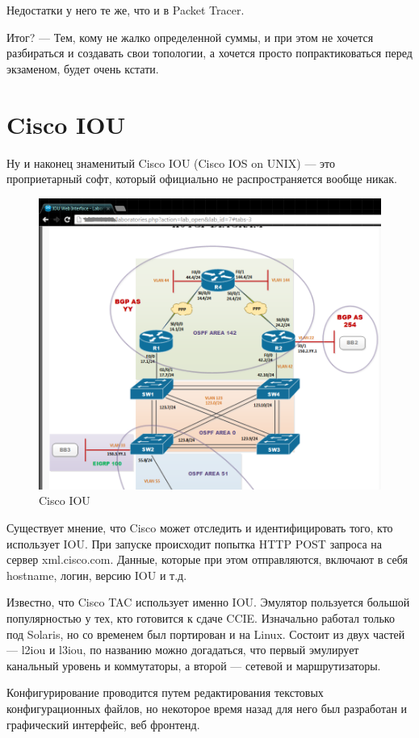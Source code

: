\documentclass[a4paper,14pt]{extreport}
\begin{document}
	
	Недостатки у него те же, что и в Packet Tracer.
	
	Итог?
	— Тем, кому не жалко определенной суммы, и при этом не хочется разбираться и создавать свои топологии, а хочется просто попрактиковаться перед экзаменом, будет очень кстати.
	
	\section{Cisco IOU}
	
	Ну и наконец знаменитый Cisco IOU (Cisco IOS on UNIX) — это проприетарный софт, который официально не распространяется вообще никак.
	
\begin{figure}[h!]
\centering
\includegraphics[width=0.7\linewidth]{pic/ciscoIOU}
\caption{Cisco IOU}
\label{fig:ciscoIOU}
\end{figure}
	
	Существует мнение, что Cisco может отследить и идентифицировать того, кто использует IOU.
	При запуске происходит попытка HTTP POST запроса на сервер xml.cisco.com.
	Данные, которые при этом отправляются, включают в себя hostname, логин, версию IOU и т.д.
	
	Известно, что Cisco TAC использует именно IOU.
	Эмулятор пользуется большой популярностью у тех, кто готовится к сдаче CCIE.
	Изначально работал только под Solaris, но со временем был портирован и на Linux.
	Состоит из двух частей — l2iou и l3iou, по названию можно догадаться, что первый эмулирует канальный уровень и коммутаторы, а второй — сетевой и маршрутизаторы.
	
	Конфигурирование проводится путем редактирования текстовых конфигурационных файлов, но некоторое время назад для него был разработан и графический интерфейс, веб фронтенд.	
	
\end{document}
